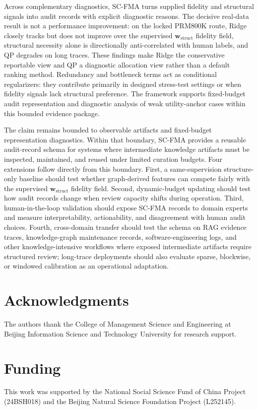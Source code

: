\documentclass[a4paper,fleqn]{cas-sc}
\newcommand{\wstruct}{\ensuremath{\mathbf{w}_{\mathrm{struct}}}}
\begin{document}
Across complementary diagnostics, SC-FMA turns supplied fidelity and structural signals into audit records with explicit diagnostic reasons. The decisive real-data result is not a performance improvement: on the locked PRM800K route, Ridge closely tracks but does not improve over the supervised \wstruct{} fidelity field, structural necessity alone is directionally anti-correlated with human labels, and QP degrades on long traces. These findings make Ridge the conservative reportable view and QP a diagnostic allocation view rather than a default ranking method. Redundancy and bottleneck terms act as conditional regularizers: they contribute primarily in designed stress-test settings or when fidelity signals lack structural preference. The framework supports fixed-budget audit representation and diagnostic analysis of weak utility-anchor cases within this bounded evidence package.

The claim remains bounded to observable artifacts and fixed-budget representation diagnostics. Within that boundary, SC-FMA provides a reusable audit-record schema for systems where intermediate knowledge artifacts must be inspected, maintained, and reused under limited curation budgets. Four extensions follow directly from this boundary. First, a same-supervision structure-only baseline should test whether graph-derived features can compete fairly with the supervised \wstruct{} fidelity field. Second, dynamic-budget updating should test how audit records change when review capacity shifts during operation. Third, human-in-the-loop validation should expose SC-FMA records to domain experts and measure interpretability, actionability, and disagreement with human audit choices. Fourth, cross-domain transfer should test the schema on RAG evidence traces, knowledge-graph maintenance records, software-engineering logs, and other knowledge-intensive workflows where exposed intermediate artifacts require structured review; long-trace deployments should also evaluate sparse, blockwise, or windowed calibration as an operational adaptation.

\section*{Acknowledgments}
The authors thank the College of Management Science and Engineering at Beijing Information Science and Technology University for research support.

\section*{Funding}
This work was supported by the National Social Science Fund of China Project (24BSH018) and the Beijing Natural Science Foundation Project (L252145).
\end{document}
